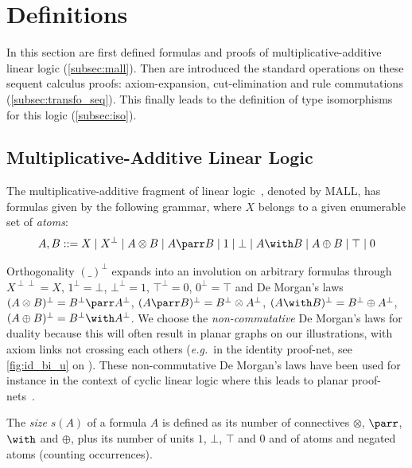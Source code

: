\documentclass{lmcs}
\newcommand*{\orth}{^\perp} %
\newcommand*{\biorth}{^{\perp\perp}} %
\newcommand*{\tens}{\otimes} %
\newcommand*{\eg}{\emph{e.g.}}
\newcommand{\coloncoloneqq}{\mathrel{::=}}
\begin{document}
\section{Definitions}
\label{sec:def}

In this section are first defined formulas and proofs of multiplicative-additive linear logic (\autoref{subsec:mall}).
Then are introduced the standard operations on these sequent calculus proofs: axiom-expansion, cut-elimination and rule commutations (\autoref{subsec:transfo_seq}).
This finally leads to the definition of type isomorphisms for this logic (\autoref{subsec:iso}).

\subsection{Multiplicative-Additive Linear Logic}
\label{subsec:mall}

The multiplicative-additive fragment of linear logic~\cite{ll}, denoted by MALL, has formulas given by the following grammar, where $X$ belongs to a given enumerable set of \emph{atoms}:
\[A,B \coloncoloneqq X \mid X\orth \mid A\tens B \mid A\parr B \mid 1 \mid \bot \mid A \with B \mid A \oplus B \mid \top \mid 0\]

Orthogonality $(\_)\orth$ expands into an involution on arbitrary formulas through ${X\biorth=X}$, ${1\orth=\bot}$, ${\bot\orth=1}$, ${\top\orth=0}$, ${0\orth=\top}$ and De Morgan's laws ${(A\tens B)\orth=B\orth\parr A\orth}$, $(A\parr B)\orth=B\orth\tens A\orth$, ${(A\with B)\orth=B\orth\oplus A\orth}$, ${(A\oplus B)\orth=B\orth\with A\orth}$.
We choose the \emph{non-commutative} De Morgan's laws for duality because this will often result in planar graphs on our illustrations, with axiom links not crossing each others (\eg\ in the identity proof-net, see \autoref{fig:id_bi_u} on ).
These non-commutative De Morgan's laws have been used for instance in the context of cyclic linear logic where this leads to planar proof-nets~\cite{cccypn}.

The \emph{size} $s(A)$ of a formula $A$ is defined as its number of connectives $\tens$, $\parr$, $\with$ and $\oplus$, plus its number of units $1$, $\bot$, $\top$ and $0$ and of atoms and negated atoms (counting occurrences).
\end{document}
